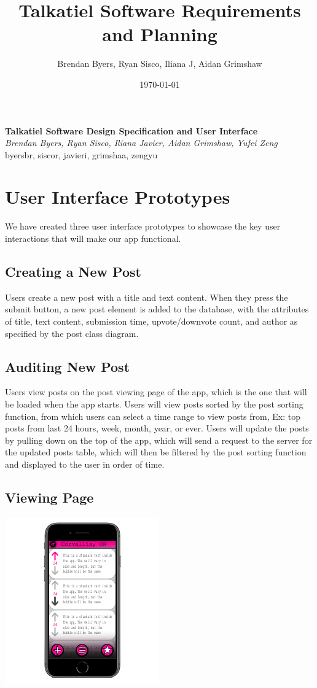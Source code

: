 \documentclass[12pt]{article}
\title{Talkatiel Software Requirements and Planning}
\author{Brendan Byers, Ryan Sisco, Iliana J, Aidan Grimshaw}
\date{\today}
\begin{document}
\begin{center}
      \Large\textbf{Talkatiel Software Design Specification and User Interface}\\
      \large\textit{Brendan Byers, Ryan Sisco, Iliana Javier, Aidan Grimshaw, Yufei Zeng}\\
      \large{byersbr, siscor, javieri, grimshaa, zengyu}\\
   \end{center}

\section{User Interface Prototypes}
We have created three user interface prototypes to showcase the key user interactions that will make our app functional.

\subsection{Creating a New Post}
Users create a new post with a title and text content. When they press the submit button, a new post element is added to the database, with the attributes of title, text content, submission time, upvote/downvote count, and author as specified by the post class diagram.

\subsection{Auditing New Post}
Users view posts on the post viewing page of the app, which is the one that will be loaded when the app starts. Users will view posts sorted by the post sorting function, from which users can select a time range to view posts from, Ex: top posts from last 24 hours, week, month, year, or ever. Users will update the posts by pulling down on the top of the app, which will send a request to the server for the updated posts table, which will then be filtered by the post sorting function and displayed to the user in order of time.

\subsection{Viewing Page}
\includegraphics[scale=0.75]{img/homescreen}
\end{document}
